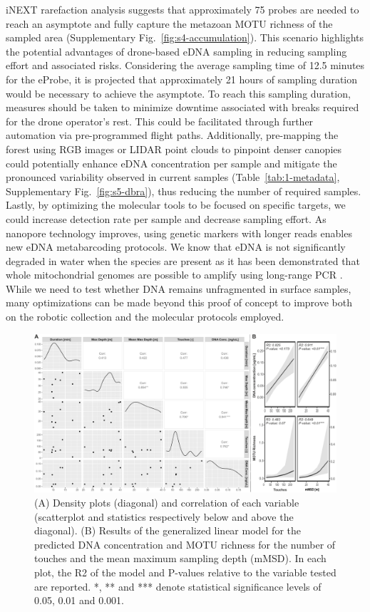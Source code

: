 iNEXT rarefaction analysis suggests that approximately 75 probes are needed to reach an asymptote and fully capture the metazoan \gls{MOTU} richness of the sampled area (Supplementary Fig.~\ref{fig:s4-accumulation}). This scenario highlights the potential advantages of drone-based \gls{eDNA} sampling in reducing sampling effort and associated risks. Considering the average sampling time of 12.5 minutes for the eProbe, it is projected that approximately 21 hours of sampling duration would be necessary to achieve the asymptote. To reach this sampling duration, measures should be taken to minimize downtime associated with breaks required for the drone operator's rest. This could be facilitated through further automation via pre-programmed flight paths. Additionally, pre-mapping the forest using RGB images or LIDAR point clouds to pinpoint denser canopies could potentially enhance \gls{eDNA} concentration per sample and mitigate the pronounced variability observed in current samples (Table~\ref{tab:1-metadata}, Supplementary Fig.~\ref{fig:s5-dbra}), thus reducing the number of required samples. Lastly, by optimizing the molecular tools to be focused on specific targets, we could increase detection rate per sample and decrease sampling effort. As nanopore technology improves, using genetic markers with longer reads enables new \gls{eDNA} metabarcoding protocols. We know that \gls{eDNA} is not significantly degraded in water when the species are present as it has been demonstrated that whole mitochondrial genomes are possible to amplify using long-range PCR \cite{deiner-2017}. While we need to test whether DNA remains unfragmented in surface samples, many optimizations can be made beyond this proof of concept to improve both on the robotic collection and the molecular protocols employed.

\begin{figure}[tb]
    \centering
    \includegraphics[width=\linewidth]{figures/06_corr.pdf}
    \caption{(A) Density plots (diagonal) and correlation of each variable (scatterplot and statistics respectively below and above the diagonal). (B) Results of the generalized linear model for the predicted DNA concentration and \gls{MOTU} richness for the number of touches and the mean maximum sampling depth (mMSD). In each plot, the R2 of the model and P-values relative to the variable tested are reported. *, ** and *** denote statistical significance levels of 0.05, 0.01 and 0.001.}
    \label{fig:6-corr}
\end{figure}

